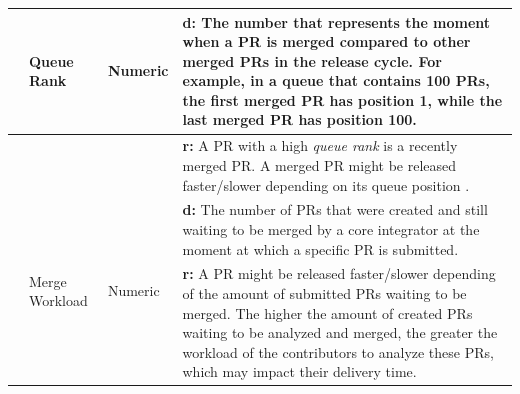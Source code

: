 \begin{table}[htbp]
\begin{tabular}{|>{\centering\arraybackslash}m{0.45in}|m{0.60in}|m{0.4in}|m{2.5in}|}
		
		\multirow{13}{*}{Project} & \multirow{4}{2cm}{Queue Rank} & \multirow{4}{*}{Numeric} & \textbf{d:} The number that represents the moment when a PR is merged compared to other merged PRs in the release cycle. For example, in a queue that contains 100 PRs, the first merged PR has position 1, while the last merged PR has position 100.  \\ \cline{4-4}
		& &  & \textbf{r:} A PR with a high \textit{queue rank} is a recently merged PR. A merged PR might be released faster/slower depending on its queue position \citep{Da_Costa2016-cb}. \\ \cline{ 2- 4}
		
		& \multirow{6}{1.5cm}{Merge Workload} & \multirow{6}{*}{Numeric} & \textbf{d:} The number of PRs that were created and still waiting to be merged by a core integrator at the moment at which a specific PR is submitted. \\ \cline{4-4}
		& &  & \textbf{r:} A PR might be released faster/slower depending of the
		amount of submitted PRs waiting to be merged. The higher the
		amount of created PRs waiting to be analyzed and merged, the
		greater the workload of the contributors to analyze these PRs,
		which may impact their delivery time.
		\\ \hline
	\end{tabular}
	\label{tab_explanatory_variables_1}
\end{table}
\egroup

\bgroup
\def\arraystretch{1}

